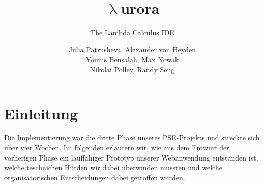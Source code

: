 \documentclass[parskip=full,11pt,twoside]{scrartcl}
\title{\textbf{$\uplambda$}urora}
\subtitle{The Lambda Calculus IDE}
\author{Julia Patrusheva, Alexander von Heyden\\
Younis Bensalah, Max Nowak\\
Nikolai Polley, Randy Seng}
\begin{document}
\maketitle
\tableofcontents
\newpage
\section{Einleitung}
Die Implementierung war die dritte Phase unseres PSE-Projekts und streckte sich über vier Wochen.
Im folgenden erläutern wir, wie aus dem Entwurf der vorherigen Phase ein lauffähiger Prototyp unserer Webanwendung
entstanden ist, welche teschnichen Hürden wir dabei überwinden mussten und welche organisatorischen Entscheidungen
dabei getroffen wurden.
\newline
\newpage

\end{document}
